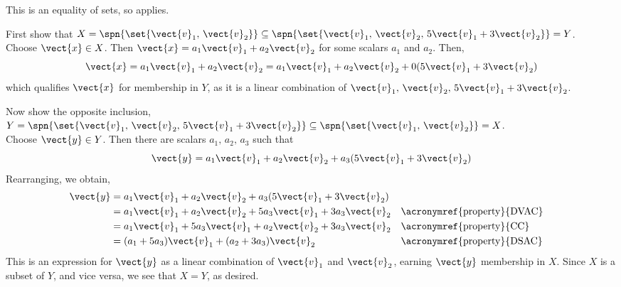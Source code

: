 This is an equality of sets, so  applies.\par
%
First show that $X=\spn{\set{\vect{v}_1,\,\vect{v}_2}}\subseteq
\spn{\set{\vect{v}_1,\,\vect{v}_2,\,5\vect{v}_1+3\vect{v}_2}}=Y$.\\
%
Choose $\vect{x}\in X$.  Then $\vect{x}=a_1\vect{v}_1+a_2\vect{v}_2$ for some scalars $a_1$ and $a_2$.  Then,
%
\begin{equation*}
\vect{x}=a_1\vect{v}_1+a_2\vect{v}_2=a_1\vect{v}_1+a_2\vect{v}_2+0(5\vect{v}_1+3\vect{v}_2)
\end{equation*}
%
which qualifies $\vect{x}$ for membership in $Y$, as it is a linear combination of $\vect{v}_1,\,\vect{v}_2,\,5\vect{v}_1+3\vect{v}_2$.\par
%
Now show the opposite inclusion, $Y=\spn{\set{\vect{v}_1,\,\vect{v}_2,\,5\vect{v}_1+3\vect{v}_2}}\subseteq\spn{\set{\vect{v}_1,\,\vect{v}_2}}=X$.\\
%
Choose $\vect{y}\in Y$.  Then there are scalars $a_1,\,a_2,\,a_3$ such that
%
\begin{equation*}
\vect{y}=a_1\vect{v}_1+a_2\vect{v}_2+a_3(5\vect{v}_1+3\vect{v}_2)
\end{equation*}
%
Rearranging, we obtain,
%
\begin{align*}
\vect{y}&=a_1\vect{v}_1+a_2\vect{v}_2+a_3(5\vect{v}_1+3\vect{v}_2)\\
%
&=a_1\vect{v}_1+a_2\vect{v}_2+5a_3\vect{v}_1+3a_3\vect{v}_2&&\text{\acronymref{property}{DVAC}}\\
%
&=a_1\vect{v}_1+5a_3\vect{v}_1+a_2\vect{v}_2+3a_3\vect{v}_2&&\text{\acronymref{property}{CC}}\\
%
&=(a_1+5a_3)\vect{v}_1+(a_2+3a_3)\vect{v}_2&&\text{\acronymref{property}{DSAC}}\\
%
\end{align*}
%
This is an expression for $\vect{y}$ as a linear combination of $\vect{v}_1$ and $\vect{v}_2$, earning $\vect{y}$ membership in $X$.
%
Since $X$ is a subset of $Y$, and vice versa, we see that $X=Y$, as desired.

